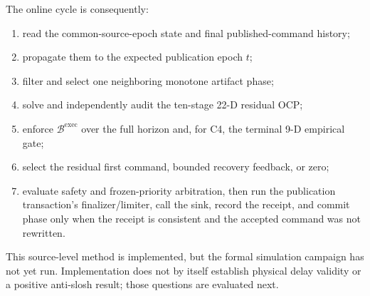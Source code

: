 The online cycle is consequently:
\begin{enumerate}
  \item read the common-source-epoch state and final published-command history;
  \item propagate them to the expected publication epoch $t$;
  \item filter and select one neighboring monotone artifact phase;
  \item solve and independently audit the ten-stage 22-D residual OCP;
  \item enforce $\mathcal B^{\mathrm{exec}}$ over the full horizon and, for
    C4, the terminal 9-D empirical gate;
  \item select the residual first command, bounded recovery feedback, or zero;
  \item evaluate safety and frozen-priority arbitration, then run the
    publication transaction's finalizer/limiter, call the sink, record the
    receipt, and commit phase only when the receipt is consistent and the
    accepted command was not rewritten.
\end{enumerate}

This source-level method is implemented, but the formal simulation campaign has
not yet run.  Implementation does not by itself establish physical delay
validity or a positive anti-slosh result; those questions are evaluated next.
